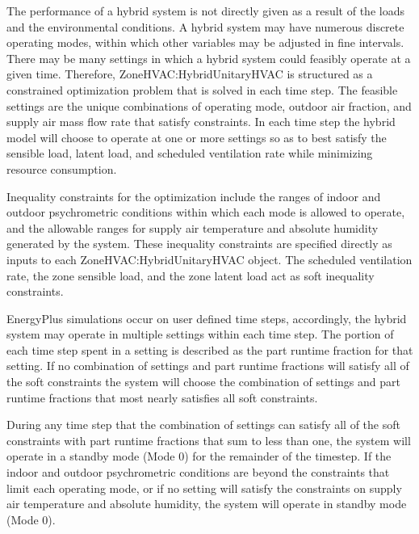 The performance of a hybrid system is not directly given as a result of the loads and the environmental conditions. A hybrid system may have numerous discrete operating modes, within which other variables may be adjusted in fine intervals. There may be many settings in which a hybrid system could feasibly operate at a given time. Therefore, ZoneHVAC:HybridUnitaryHVAC is structured as a constrained optimization problem that is solved in each time step. The feasible settings are the unique combinations of operating mode, outdoor air fraction, and supply air mass flow rate that satisfy constraints. In each time step the hybrid model will choose to operate at one or more settings so as to best satisfy the sensible load, latent load, and scheduled ventilation rate while minimizing resource consumption.

Inequality constraints for the optimization include the ranges of indoor and outdoor psychrometric conditions within which each mode is allowed to operate, and the allowable ranges for supply air temperature and absolute humidity generated by the system. These inequality constraints are specified directly as inputs to each ZoneHVAC:HybridUnitaryHVAC object. The scheduled ventilation rate, the zone sensible load, and the zone latent load act as soft inequality constraints.

EnergyPlus simulations occur on user defined time steps, accordingly, the hybrid system may operate in multiple settings within each time step. The portion of each time step spent in a setting is described as the part runtime fraction for that setting. If no combination of settings and part runtime fractions will satisfy all of  the soft constraints the system will choose the combination of settings and part runtime fractions that most nearly satisfies all soft constraints.

During any time step that the combination of settings can satisfy all of the soft constraints with part runtime fractions that sum to less than one, the system will operate in a standby mode (Mode 0) for the remainder of the timestep. If the indoor and outdoor psychrometric conditions are beyond the constraints that limit each operating mode, or if no setting will satisfy the constraints on supply air temperature and absolute humidity, the system will operate in standby mode (Mode 0).

